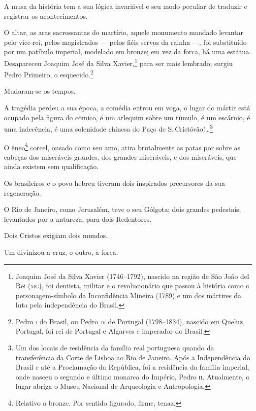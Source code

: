 \noindent\dotfill{}

A musa da história tem a sua lógica invariável e seu modo peculiar de
traduzir e registrar os acontecimentos.

O altar, as aras sacrossantas do martírio, aquele monumento mandado
levantar pelo vice-rei, pelos magistrados --- pelos fiéis servos da
rainha ---, foi substituído por um patíbulo imperial, modelado em
bronze; em vez da forca, há uma estátua. Desapareceu Joaquim José da
Silva Xavier,\footnote{Joaquim José da Silva Xavier (1746--1792),
  nascido na região de São João del Rei (\textsc{mg}), foi dentista, militar e o
  revolucionário que passou à história como o personagem-símbolo da
  Inconfidência Mineira (1789) e um dos mártires da luta pela
  independência do Brasil.} para ser mais lembrado; surgiu Pedro
Primeiro, o esquecido.\footnote{Pedro \textsc{i} do Brasil, ou Pedro \textsc{iv} de
  Portugal (1798--1834), nascido em Queluz, Portugal, foi rei de Portugal
  e Algarves e imperador do Brasil.}

Mudaram-se os tempos.

A tragédia perdeu a sua época, a comédia entrou em voga, o lugar do
mártir está ocupado pela figura do cômico, é um arlequim sobre um
túmulo, é um escárnio, é uma indecência, é uma solenidade chinesa do
Paço de S.\,Cristóvão!\ldots{}\footnote{Um dos locais de residência
  da família real portuguesa quando da transferência da
  Corte de Lisboa ao Rio de Janeiro. Após a Independência do Brasil e até a Proclamação da República, foi a residência da família
  imperial, onde nasceu o segundo e último monarca do
  Império, Pedro \textsc{ii}. Atualmente, o lugar abriga o Museu Nacional de
  Arqueologia e Antropologia.}

O êneo\footnote{Relativo a bronze. Por sentido figurado, firme, tenaz.}
corcel, ousado como seu amo, atira brutalmente as patas por sobre as
cabeças dos miseráveis grandes, dos grandes miseráveis, e dos
miseráveis, que ainda existem sem qualificação.

Os brasileiros e o povo hebreu tiveram dois inspirados precursores da
sua regeneração.

O Rio de Janeiro, como Jerusalém, teve o seu Gólgota; dois grandes
pedestais, levantados por a natureza, para dois Redentores.

Dois Cristos exigiam dois mundos.

Um divinizou a cruz, o outro, a forca.

